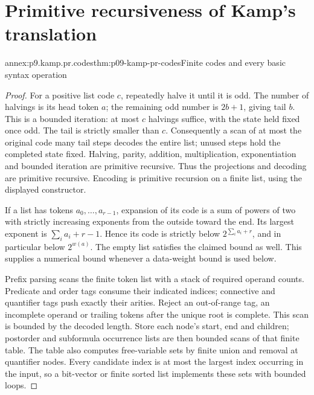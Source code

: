 
\section{Primitive recursiveness of Kamp's translation}
\label{sec:annex-p09-kamp-primitive-recursive-translation}

\begin{annexitem}{annex:p9.kamp.pr.codes}{thm:p09-kamp-pr-codes}{Finite codes and every basic syntax operation}
\begin{proof}
For a positive list code \(c\), repeatedly halve it until it is odd.
The number of halvings is its head token \(a\); the remaining odd
number is \(2b+1\), giving tail \(b\). This is a bounded
iteration: at most \(c\) halvings suffice, with the state held
fixed once odd. The tail is strictly smaller than \(c\).
Consequently a scan of at most the original code many tail steps
decodes the entire list; unused steps hold the completed state fixed.
Halving, parity, addition, multiplication, exponentiation and bounded
iteration are primitive recursive. Thus the projections and decoding
are primitive recursive. Encoding is primitive recursion on a finite
list, using the displayed constructor.

If a list has tokens \(a_0,\ldots,a_{r-1}\), expansion of its
code is a sum of powers of two with strictly increasing exponents
from the outside toward the end. Its largest exponent is
\(\sum_i a_i+r-1\). Hence its code is strictly below
\(2^{\sum_i a_i+r}\), and in particular below \(2^{w(a)}\).
The empty list satisfies the claimed bound as well. This supplies
a numerical bound whenever a data-weight bound is used below.

Prefix parsing scans the finite token list with a stack of required
operand counts. Predicate and order tags consume their indicated
indices; connective and quantifier tags push exactly their arities.
Reject an out-of-range tag, an incomplete operand or trailing tokens
after the unique root is complete. This scan is bounded by the decoded
length. Store each node's start, end and children; postorder and
subformula occurrence lists are then bounded scans of that finite table.
The table also computes free-variable sets by finite union and removal
at quantifier nodes. Every candidate index is at most the largest
index occurring in the input, so a bit-vector or finite sorted list
implements these sets with bounded loops.


\end{proof}
\end{annexitem}
